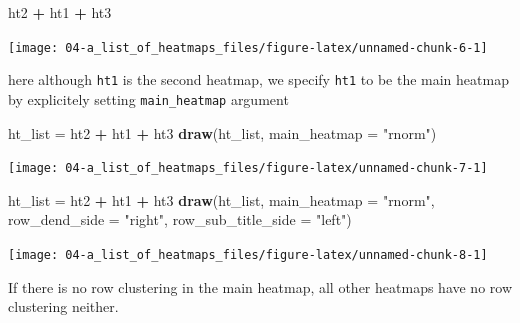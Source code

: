 \documentclass[]{book}
\newenvironment{Shaded}{\begin{snugshade}}{\end{snugshade}}
\newcommand{\KeywordTok}[1]{\textcolor[rgb]{0.13,0.29,0.53}{\textbf{#1}}}
\newcommand{\DataTypeTok}[1]{\textcolor[rgb]{0.13,0.29,0.53}{#1}}
\newcommand{\StringTok}[1]{\textcolor[rgb]{0.31,0.60,0.02}{#1}}
\newcommand{\OperatorTok}[1]{\textcolor[rgb]{0.81,0.36,0.00}{\textbf{#1}}}
\newcommand{\NormalTok}[1]{#1}
\theoremstyle{definition}
\theoremstyle{definition}
\theoremstyle{definition}
\theoremstyle{remark}
\begin{document}
\begin{Shaded}
\begin{Highlighting}[]
\NormalTok{ht2 }\OperatorTok{+}\StringTok{ }\NormalTok{ht1 }\OperatorTok{+}\StringTok{ }\NormalTok{ht3}
\end{Highlighting}
\end{Shaded}

\begin{center}\texttt{[image: 04-a\_list\_of\_heatmaps\_files/figure-latex/unnamed-chunk-6-1]} \end{center}

here although \texttt{ht1} is the second heatmap, we specify
\texttt{ht1} to be the main heatmap by explicitely setting
\texttt{main\_heatmap} argument

\begin{Shaded}
\begin{Highlighting}[]
\NormalTok{ht_list =}\StringTok{ }\NormalTok{ht2 }\OperatorTok{+}\StringTok{ }\NormalTok{ht1 }\OperatorTok{+}\StringTok{ }\NormalTok{ht3}
\KeywordTok{draw}\NormalTok{(ht_list, }\DataTypeTok{main_heatmap =} \StringTok{"rnorm"}\NormalTok{)}
\end{Highlighting}
\end{Shaded}

\begin{center}\texttt{[image: 04-a\_list\_of\_heatmaps\_files/figure-latex/unnamed-chunk-7-1]} \end{center}

\begin{Shaded}
\begin{Highlighting}[]
\NormalTok{ht_list =}\StringTok{ }\NormalTok{ht2 }\OperatorTok{+}\StringTok{ }\NormalTok{ht1 }\OperatorTok{+}\StringTok{ }\NormalTok{ht3}
\KeywordTok{draw}\NormalTok{(ht_list, }\DataTypeTok{main_heatmap =} \StringTok{"rnorm"}\NormalTok{, }\DataTypeTok{row_dend_side =} \StringTok{"right"}\NormalTok{, }\DataTypeTok{row_sub_title_side =} \StringTok{"left"}\NormalTok{)}
\end{Highlighting}
\end{Shaded}

\begin{center}\texttt{[image: 04-a\_list\_of\_heatmaps\_files/figure-latex/unnamed-chunk-8-1]} \end{center}

If there is no row clustering in the main heatmap, all other heatmaps
have no row clustering neither.
\end{document}
